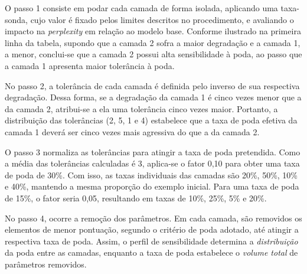O passo 1 consiste em podar cada camada de forma isolada, aplicando uma taxa-sonda, cujo
valor é fixado pelos limites descritos no procedimento, e avaliando o impacto na
\textit{perplexity} em relação ao modelo base. Conforme ilustrado na primeira linha da tabela, supondo que a camada
2 sofra a maior degradação e a camada 1, a menor, conclui-se que a camada 2 possui alta
sensibilidade à poda, ao passo que a camada 1 apresenta maior tolerância à poda.

No passo 2, a tolerância de cada camada é definida pelo inverso de sua respectiva
degradação. Dessa forma, se a degradação da camada 1 é cinco vezes menor que a da camada 2,
atribui-se a ela uma tolerância cinco vezes maior. Portanto, a distribuição das tolerâncias
(2, 5, 1 e 4) estabelece que a taxa de poda efetiva da camada 1 deverá ser cinco vezes mais
agressiva do que a da camada 2.

O passo 3 normaliza as tolerâncias para atingir a taxa de poda pretendida. Como a média das
tolerâncias calculadas é 3, aplica-se o fator 0,10 para obter uma taxa de poda de 30\%. Com
isso, as taxas individuais das camadas são 20\%, 50\%, 10\% e 40\%, mantendo a mesma
proporção do exemplo inicial. Para uma taxa de poda de 15\%, o fator seria 0,05, resultando
em taxas de 10\%, 25\%, 5\% e 20\%.

No passo 4, ocorre a remoção dos parâmetros. Em cada camada, são removidos os elementos de
menor pontuação, segundo o critério de poda adotado, até atingir a respectiva taxa de poda.
Assim, o perfil de sensibilidade determina a \textit{distribuição} da poda entre as camadas,
enquanto a taxa de poda estabelece o \textit{volume total} de parâmetros removidos.



